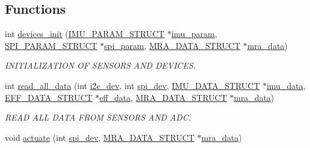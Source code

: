 \subsection*{Functions}
\begin{DoxyCompactItemize}
\item 
int \hyperlink{communication_01_07C_xC3_xB3pia_01em_01conflito_01de_01Caio_01Gustavo_01Mesquita_01Angelo_012013-05-17_08_8c_a2d1e523ff70db11ca4096f97af5da000}{devices\-\_\-init} (\hyperlink{structIMU__PARAM__STRUCT}{I\-M\-U\-\_\-\-P\-A\-R\-A\-M\-\_\-\-S\-T\-R\-U\-C\-T} $\ast$\hyperlink{main2_8c_a9c6b2109fb9402446f92995db60951b5}{imu\-\_\-param}, \hyperlink{structSPI__PARAM__STRUCT}{S\-P\-I\-\_\-\-P\-A\-R\-A\-M\-\_\-\-S\-T\-R\-U\-C\-T} $\ast$\hyperlink{main2_8c_adec2468b88cf50b20e5cf399a3b7e994}{spi\-\_\-param}, \hyperlink{structMRA__DATA__STRUCT}{M\-R\-A\-\_\-\-D\-A\-T\-A\-\_\-\-S\-T\-R\-U\-C\-T} $\ast$\hyperlink{main2_8c_abc42e18d2909e9bc119316283f4ed9db}{mra\-\_\-data})
\begin{DoxyCompactList}\small\item\em I\-N\-I\-T\-I\-A\-L\-I\-Z\-A\-T\-I\-O\-N O\-F S\-E\-N\-S\-O\-R\-S A\-N\-D D\-E\-V\-I\-C\-E\-S. \end{DoxyCompactList}\item 
int \hyperlink{communication_01_07C_xC3_xB3pia_01em_01conflito_01de_01Caio_01Gustavo_01Mesquita_01Angelo_012013-05-17_08_8c_a5f0316a5f70c7e369541e996802603b4}{read\-\_\-all\-\_\-data} (int \hyperlink{CommunicationV0_2communication_8c_a7751bd45ac1064efb35adf1f19c25db8}{i2c\-\_\-dev}, int \hyperlink{CommunicationV0_2communication_8c_a4788f0a5355494bc6c13690e28f43783}{spi\-\_\-dev}, \hyperlink{structIMU__DATA__STRUCT}{I\-M\-U\-\_\-\-D\-A\-T\-A\-\_\-\-S\-T\-R\-U\-C\-T} $\ast$\hyperlink{threads__linux_8c_a3cfea12cbe9ca7f1681c950e4cd68606}{imu\-\_\-data}, \hyperlink{structEFF__DATA__STRUCT}{E\-F\-F\-\_\-\-D\-A\-T\-A\-\_\-\-S\-T\-R\-U\-C\-T} $\ast$\hyperlink{main2_8c_a5650ece8c3a277c7f158d75ae65265fa}{eff\-\_\-data}, \hyperlink{structMRA__DATA__STRUCT}{M\-R\-A\-\_\-\-D\-A\-T\-A\-\_\-\-S\-T\-R\-U\-C\-T} $\ast$\hyperlink{main2_8c_abc42e18d2909e9bc119316283f4ed9db}{mra\-\_\-data})
\begin{DoxyCompactList}\small\item\em R\-E\-A\-D A\-L\-L D\-A\-T\-A F\-R\-O\-M S\-E\-N\-S\-O\-R\-S A\-N\-D A\-D\-C. \end{DoxyCompactList}\item 
void \hyperlink{communication_01_07C_xC3_xB3pia_01em_01conflito_01de_01Caio_01Gustavo_01Mesquita_01Angelo_012013-05-17_08_8c_a1d5f01d0124cff7030b5c4951b4bbefa}{actuate} (int \hyperlink{CommunicationV0_2communication_8c_a4788f0a5355494bc6c13690e28f43783}{spi\-\_\-dev}, \hyperlink{structMRA__DATA__STRUCT}{M\-R\-A\-\_\-\-D\-A\-T\-A\-\_\-\-S\-T\-R\-U\-C\-T} $\ast$\hyperlink{main2_8c_abc42e18d2909e9bc119316283f4ed9db}{mra\-\_\-data})

\end{DoxyCompactItemize}
